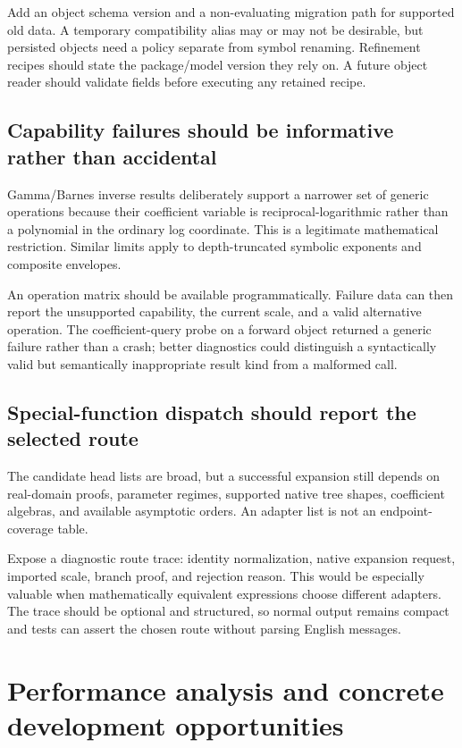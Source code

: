 \documentclass[11pt,a4paper]{article}
\newcommand{\code}[1]{\texttt{\detokenize{#1}}}
\begin{document}
Add an object schema version and a non-evaluating migration path for supported old data. A temporary compatibility alias may or may not be desirable, but persisted objects need a policy separate from symbol renaming. Refinement recipes should state the package/model version they rely on. A future object reader should validate fields before executing any retained recipe.

\subsection{Capability failures should be informative rather than accidental}
Gamma/Barnes inverse results deliberately support a narrower set of generic operations because their coefficient variable is reciprocal-logarithmic rather than a polynomial in the ordinary log coordinate. This is a legitimate mathematical restriction. Similar limits apply to depth-truncated symbolic exponents and composite envelopes.\cite{operations,gamma,arithmetic}

An operation matrix should be available programmatically. Failure data can then report the unsupported capability, the current scale, and a valid alternative operation. The coefficient-query probe on a forward object returned a generic \code{InvalidArguments} failure rather than a crash; better diagnostics could distinguish a syntactically valid but semantically inappropriate result kind from a malformed call.

\subsection{Special-function dispatch should report the selected route}
The candidate head lists are broad, but a successful expansion still depends on real-domain proofs, parameter regimes, supported native tree shapes, coefficient algebras, and available asymptotic orders. An adapter list is not an endpoint-coverage table.\cite{native,guide}

Expose a diagnostic route trace: identity normalization, native expansion request, imported scale, branch proof, and rejection reason. This would be especially valuable when mathematically equivalent expressions choose different adapters. The trace should be optional and structured, so normal output remains compact and tests can assert the chosen route without parsing English messages.

\section{Performance analysis and concrete development opportunities}
\end{document}
